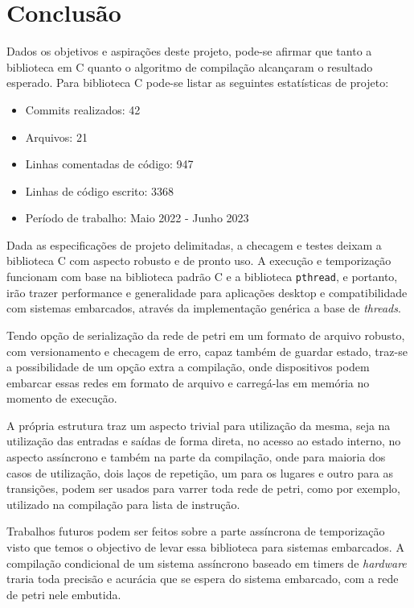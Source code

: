 \chapter{Conclusão}

Dados os objetivos e aspirações deste projeto, pode-se afirmar que tanto a biblioteca em C quanto o algoritmo de compilação alcançaram o resultado esperado. Para biblioteca C \cite{github-pnet} pode-se listar as seguintes estatísticas de projeto:

\begin{itemize}
	\item Commits realizados: 42
 	\item Arquivos: 21
 	\item Linhas comentadas de código: 947
 	\item Linhas de código escrito: 3368
	\item Período de trabalho: Maio 2022 - Junho 2023
\end{itemize}

Dada as especificações de projeto delimitadas, a checagem e testes deixam a biblioteca C com aspecto robusto e de pronto uso. A execução e temporização funcionam com base na biblioteca padrão C e a biblioteca \lstinline{pthread}, e portanto, irão trazer performance e generalidade para aplicações desktop e compatibilidade com sistemas embarcados, através da implementação genérica a base de \textit{threads}.

Tendo opção de serialização da rede de petri em um formato de arquivo robusto, com versionamento e checagem de erro, capaz também de guardar estado, traz-se a possibilidade de um opção extra a compilação, onde dispositivos podem embarcar essas redes em formato de arquivo e carregá-las em memória no momento de execução.

A própria estrutura traz um aspecto trivial para utilização da mesma, seja na utilização das entradas e saídas de forma direta, no acesso ao estado interno, no aspecto assíncrono e também na parte da compilação, onde para maioria dos casos de utilização, dois laços de repetição, um para os lugares e outro para as transições, podem ser usados para varrer toda rede de petri, como por exemplo, utilizado na compilação para lista de instrução.

Trabalhos futuros podem ser feitos sobre a parte assíncrona de temporização visto que temos o objectivo de levar essa biblioteca para sistemas embarcados. A compilação condicional de um sistema assíncrono baseado em timers de \textit{hardware} traria toda precisão e acurácia que se espera do sistema embarcado, com a rede de petri nele embutida.

